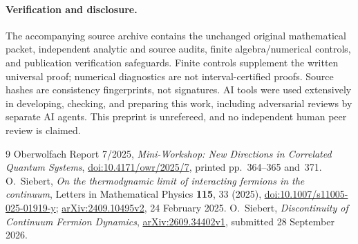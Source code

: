 \documentclass[11pt]{article}
\begin{document}
\paragraph{Verification and disclosure.}
The accompanying source archive contains the unchanged original mathematical
packet, independent analytic and source audits, finite algebra/numerical
controls, and publication verification safeguards. Finite controls supplement
the written universal proof; numerical diagnostics are not interval-certified
proofs. Source hashes are consistency fingerprints, not signatures. AI tools
were used extensively in developing, checking, and preparing this work,
including adversarial reviews by separate AI agents. This preprint is
unrefereed, and no independent human peer review is claimed.

\begin{thebibliography}{9}
 Oberwolfach Report 7/2025,
\emph{Mini-Workshop: New Directions in Correlated Quantum Systems},
\href{https://doi.org/10.4171/owr/2025/7}{doi:10.4171/owr/2025/7},
printed pp.~364--365 and~371.
 O.~Siebert,
\emph{On the thermodynamic limit of interacting fermions in the continuum},
Letters in Mathematical Physics \textbf{115}, 33 (2025),
\href{https://doi.org/10.1007/s11005-025-01919-y}{doi:10.1007/s11005-025-01919-y};
\href{https://arxiv.org/abs/2409.10495v2}{arXiv:2409.10495v2}, 24 February 2025.
 O.~Siebert,
\emph{Discontinuity of Continuum Fermion Dynamics},
\href{https://arxiv.org/abs/2609.34402v1}{arXiv:2609.34402v1},
submitted 28 September 2026.
\end{thebibliography}
\end{document}
